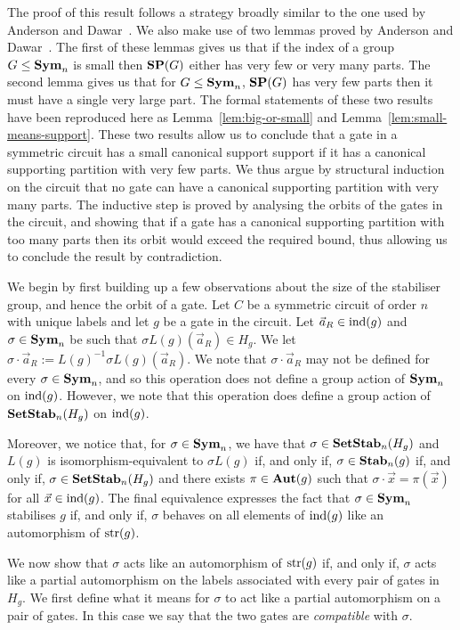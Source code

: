 \documentclass[../paper.tex]{subfiles}
\begin{document}
The proof of this result follows a strategy broadly similar to the one used by
Anderson and Dawar~\cite{AndersonD17}. We also make use of two lemmas proved by
Anderson and Dawar~\cite{AndersonD17}. The first of these lemmas gives us that
if the index of a group $G \leq \text{\textbf{Sym}}_n$ is small then $\text{\textbf{SP}}(G)$ either has very
few or very many parts. The second lemma gives us that for $G \leq \text{\textbf{Sym}}_n$,
$\text{\textbf{SP}}(G)$ has very few parts then it must have a single very large part. The
formal statements of these two results have been reproduced here as
Lemma~\ref{lem:big-or-small} and Lemma~\ref{lem:small-means-support}. These two
results allow us to conclude that a gate in a symmetric circuit has a small
canonical support support if it has a canonical supporting partition with very
few parts. We thus argue by structural induction on the circuit that no gate can
have a canonical supporting partition with very many parts. The inductive step
is proved by analysing the orbits of the gates in the circuit, and showing that
if a gate has a canonical supporting partition with too many parts then its
orbit would exceed the required bound, thus allowing us to conclude the result
by contradiction.

We begin by first building up a few observations about the size of the
stabiliser group, and hence the orbit of a gate. Let $C$ be a symmetric circuit
of order $n$ with unique labels and let $g$ be a gate in the circuit. Let
$\vec{a}_R \in \text{\upshape ind}(g)$ and $\sigma \in \text{\textbf{Sym}}_n$ be such that $\sigma
L(g)(\vec{a}_R) \in H_g$. We let $\sigma \cdot \vec{a}_R := L(g)^{-1}\sigma
L(g)(\vec{a}_R)$. We note that $\sigma \cdot \vec{a}_R$ may not be defined for
every $\sigma \in \text{\textbf{Sym}}_n$, and so this operation does not define a group action
of $\text{\textbf{Sym}}_n$ on $\text{\upshape ind}(g)$. However, we note that this operation does define a
group action of $\text{\textbf{SetStab}}_n(H_g)$ on $\text{\upshape ind}(g)$.

Moreover, we notice that, for $\sigma \in \text{\textbf{Sym}}_n$, we have that $\sigma \in
\text{\textbf{SetStab}}_n(H_g)$ and $L(g)$ is isomorphism-equivalent to $\sigma L(g)$ if, and
only if, $\sigma \in \text{\textbf{Stab}}_n(g)$ if, and only if, $\sigma \in \text{\textbf{SetStab}}_n(H_g)$
and there exists $\pi \in \text{\textbf{Aut}}(g)$ such that $\sigma \cdot \vec{x} = \pi
(\vec{x})$ for all $\vec{x} \in \text{\upshape ind}(g)$. The final equivalence expresses the
fact that $\sigma \in \text{\textbf{Sym}}_n$ stabilises $g$ if, and only if, $\sigma$ behaves
on all elements of $\text{\upshape ind}(g)$ like an automorphism of $\text{str}(g)$.

We now show that $\sigma$ acts like an automorphism of $\text{str}(g)$ if, and only
if, $\sigma$ acts like a partial automorphism on the labels associated with
every pair of gates in $H_g$. We first define what it means for $\sigma$ to act
like a partial automorphism on a pair of gates. In this case we say that the two
gates are \emph{compatible} with $\sigma$.
\end{document}
